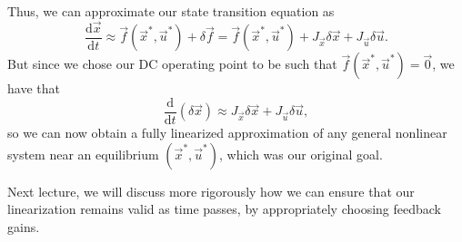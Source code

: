 \documentclass[letterpaper]{article}
\theoremstyle{remark}
\newcommand{\dt}{\mathrm{d}t}
\newcommand{\diff}{\mathrm{d}}
\begin{document}
Thus, we can approximate our state transition equation as
\[
    \frac{\diff \vec{x}}{\dt} \approx \vec{f}(\vec{x}^*, \vec{u}^*) + \delta\vec{f} = \vec{f}(\vec{x}^*, \vec{u}^*) + J_{\vec{x}} \delta \vec{x} + J_{\vec{u}} \delta \vec{u}.
\]
But since we chose our DC operating point to be such that $\vec{f}(\vec{x}^*, \vec{u}^*) = \vec{0}$, we have that
\[
    \frac{\diff}{\dt}(\delta \vec{x}) \approx J_{\vec{x}} \delta \vec{x} + J_{\vec{u}} \delta \vec{u},
\]
so we can now obtain a fully linearized approximation of any general nonlinear system near an equilibrium $(\vec{x}^*, \vec{u}^*)$, which was our original goal.

Next lecture, we will discuss more rigorously how we can ensure that our linearization remains valid as time passes, by appropriately choosing feedback gains.
\end{document}
